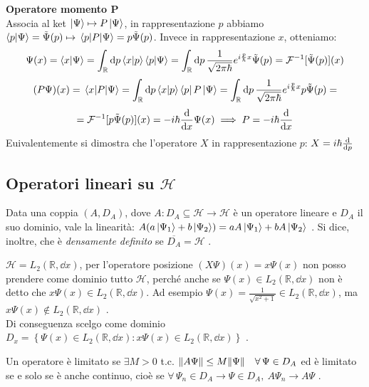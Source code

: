 
\begin{example}
    \textbf{Operatore momento P}\\
    Associa al ket \(\ket{\Psi}\mapsto P\ket{\Psi}\), in rappresentazione \(p\) 
    abbiamo \(\braket{p}{\Psi}= \tilde{\Psi}(p)\mapsto \matrixel{p}{P}{\Psi}= p\tilde{\Psi}(p)\).
    Invece in rappresentazione \(x \), otteniamo:
    \[
        \Psi(x) = \braket{x}{\Psi} = \int_\mathbb{R} \dd{p} \braket{x}{p} \braket{p}{\Psi}= 
        \int_\mathbb{R} \dd{p} \frac{1}{\sqrt{2\pi \hbar}} e^{i\frac{p}{\hbar}x} \tilde{\Psi}(p)= 
        \mathcal{F}^{-1}[\tilde{\Psi}(p)](x)
    \]
    \[
        (P\Psi)(x)= \matrixel{x}{P}{\Psi}=\int_\mathbb{R} \dd{p} \braket{x}{p} \bra{p}P\ket{\Psi}= 
        \int_\mathbb{R} \dd{p} \frac{1}{\sqrt{2\pi \hbar}} e^{i\frac{p}{\hbar}x}p \tilde{\Psi}(p)= 
    \]
    \[
        =\mathcal{F}^{-1}[p\tilde{\Psi}(p)](x)= -i\hbar \dv{x} \Psi(x) \implies P = -i\hbar \dv{x}
    \]
    Euivalentemente si dimostra che l'operatore \(X\) in rappresentazione \(p\): \(X = i\hbar \dv{p}\)
\end{example}


\subsection[Operatori lineari]{Operatori lineari su \(\mathcal{H}\)}

Data una coppia \((A, D_A)\), dove \(A: D_A \subseteq \mathcal{H}\to \mathcal{H}\) è un operatore lineare e \(D_A\) il suo dominio, 
vale la linearità: \(A(a\ket{\Psi_1}+ b\ket{\Psi_2})= aA\ket{\Psi_1}+bA\ket{\Psi_2}\) .
Si dice, inoltre, che è \textit{densamente definito} se \(\overline{D_A}= \mathcal{H}\) .

\begin{example}
    \(\mathcal{H}= L_2(\mathbb{R},\dd{x})\), per l'operatore posizione \((X\Psi)(x)= x\Psi(x)\) 
    non posso prendere come dominio tutto \(\mathcal{H}\), perché anche se \(\Psi(x) \in L_2(\mathbb{R},\dd{x})\) 
    non è detto che \(x\Psi(x) \in L_2(\mathbb{R}, \dd{x})\). 
    Ad esempio \(\Psi(x)= \frac{1}{\sqrt{x^2+1}} \in L_2(\mathbb{R},\dd{x})\), ma \(x\Psi(x) \notin  L_2(\mathbb{R}, \dd{x})\) .\\
    Di conseguenza scelgo come dominio \(D_x=  \left\{\Psi(x) \in L_2(\mathbb{R}, \dd{x}) : x \Psi(x) \in L_2(\mathbb{R}, \dd{x})  \right\}\) .
\end{example}

Un operatore è limitato se \(\exists M >0 \) t.c. \(\norm{A\Psi} \leq M \norm{\Psi}\quad \forall\, \Psi \in D_A\)
ed è limitato se e solo se è anche continuo, cioè se \(\forall\, \Psi_n \in D_A\to \Psi \in D_A, \ A\Psi_n \to A \Psi\) .

